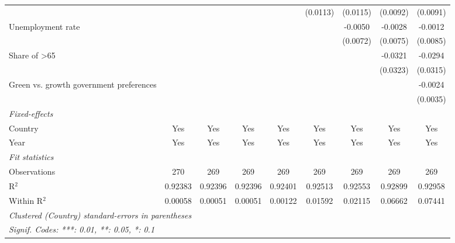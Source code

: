 \begin{table}[htbp]
\begin{tabular}{lcccccccc}
                                                &          &                       &                       &                       & (0.0113) & (0.0115) & (0.0092) & (0.0091)\\   
      Unemployment rate                         &          &                       &                       &                       &          & -0.0050  & -0.0028  & -0.0012\\   
                                                &          &                       &                       &                       &          & (0.0072) & (0.0075) & (0.0085)\\   
      Share of >65                              &          &                       &                       &                       &          &          & -0.0321  & -0.0294\\   
                                                &          &                       &                       &                       &          &          & (0.0323) & (0.0315)\\   
      Green vs. growth government preferences   &          &                       &                       &                       &          &          &          & -0.0024\\   
                                                &          &                       &                       &                       &          &          &          & (0.0035)\\   
      \midrule
      \emph{Fixed-effects}\\
      Country                                   & Yes      & Yes                   & Yes                   & Yes                   & Yes      & Yes      & Yes      & Yes\\  
      Year                                      & Yes      & Yes                   & Yes                   & Yes                   & Yes      & Yes      & Yes      & Yes\\  
      \midrule
      \emph{Fit statistics}\\
      Observations                              & 270      & 269                   & 269                   & 269                   & 269      & 269      & 269      & 269\\  
      R$^2$                                     & 0.92383  & 0.92396               & 0.92396               & 0.92401               & 0.92513  & 0.92553  & 0.92899  & 0.92958\\  
      Within R$^2$                              & 0.00058  & 0.00051               & 0.00051               & 0.00122               & 0.01592  & 0.02115  & 0.06662  & 0.07441\\  
      \midrule \midrule
      \multicolumn{9}{l}{\emph{Clustered (Country) standard-errors in parentheses}}\\
      \multicolumn{9}{l}{\emph{Signif. Codes: ***: 0.01, **: 0.05, *: 0.1}}\\
   \end{tabular}
\end{table}


